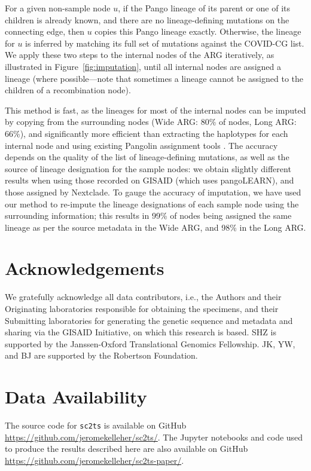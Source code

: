 \documentclass{article}
\begin{document}
For a given non-sample node $u$, if the Pango lineage of its parent or
one of its children is already known, and there are no lineage-defining mutations
on the connecting edge, then $u$ copies this Pango lineage exactly.
Otherwise, the lineage for $u$ is inferred by
matching its full set of mutations against the COVID-CG list.
We apply these two steps to the internal nodes of the ARG iteratively,
as illustrated in Figure~\ref{fig:imputation}, until all internal nodes
are assigned a lineage (where possible---note that sometimes a lineage cannot
be assigned to the children of a recombination node).

This method is fast, as the lineages for most of the internal nodes can be
imputed by copying from the surrounding nodes
(Wide ARG: 80\% of nodes,
Long ARG: 66\%),
and significantly more efficient than extracting
the haplotypes for each internal node and using existing Pangolin assignment tools
\citep{OToole2021-assignment}. The
accuracy depends on the quality of the list of lineage-defining mutations,
as well as the source of lineage designation for the sample nodes: we obtain
slightly different results when using those recorded on GISAID (which uses
pangoLEARN), and those assigned by Nextclade. To gauge the accuracy of
imputation, we have used our method to re-impute the lineage designations of each
sample node using the surrounding information; this results in
99\% of nodes being assigned the same lineage as per the source metadata in the
Wide ARG, and 98\% in the Long ARG.

\section{Acknowledgements}
We gratefully acknowledge all data contributors, i.e., the Authors and their
Originating laboratories responsible for obtaining the specimens, and their
Submitting laboratories for generating the genetic sequence and metadata and
sharing via the GISAID Initiative, on which this research is based.
SHZ is supported by the Janssen-Oxford Translational Genomics Fellowship. JK,
YW, and BJ are supported by the Robertson Foundation.

\section{Data Availability}
The source code for \texttt{sc2ts} is
available on GitHub
\url{https://github.com/jeromekelleher/sc2ts/}.
The Jupyter notebooks and code used to produce the results described here are also
available on GitHub \url{https://github.com/jeromekelleher/sc2ts-paper/}.
\end{document}
